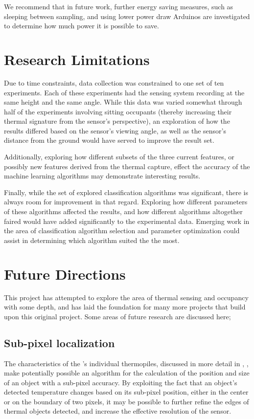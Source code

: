 \documentclass[../thesis/thesis.tex]{subfiles}
\begin{document}
We recommend that in future work, further energy saving measures, such as sleeping between sampling, and using lower power draw Arduinos are investigated to determine how much power it is possible to save.

\section{Research Limitations}
Due to time constraints, data collection was constrained to one set of ten experiments. Each of these experiments had the sensing system recording at the same height and the same angle. While this data was varied somewhat through half of the experiments involving sitting occupants (thereby increasing their thermal signature from the sensor's perspective), an exploration of how the results differed based on the sensor's viewing angle, as well as the sensor's distance from the ground would have served to improve the result set.

Additionally, exploring how different subsets of the three current features, or possibly new features derived from the thermal capture, effect the accuracy of the machine learning algorithms may demonstrate interesting results.

Finally, while the set of explored classification algorithms was significant, there is always room for improvement in that regard. Exploring how different parameters of these algorithms affected the results, and how different algorithms altogether faired would have added significantly to the experimental data. Emerging work in the area of classification algorithm selection and parameter optimization \cite{thornton2013auto} could assist in determining which algorithm suited the \mlx the most.

\section{Future Directions}
This project has attempted to explore the area of thermal sensing and occupancy with some depth, and has laid the foundation for many more projects that build upon this original project. Some areas of future research are discussed here;

\subsection{Sub-pixel localization}
The  characteristics of the \mlx's individual thermopiles, discussed in more detail in , , make potentially possible an algorithm for the calculation of the position and size of an object with a sub-pixel accuracy. By exploiting the fact that an object's detected temperature changes based on its sub-pixel position, either in the center or on the boundary of two pixels, it may be possible to further refine the edges of thermal objects detected, and increase the effective resolution of the sensor.
\end{document}
